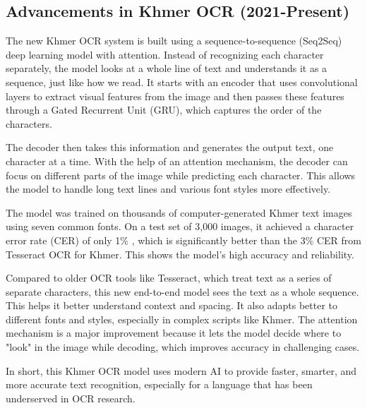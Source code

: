 \subsection{Advancements in Khmer OCR (2021-Present)}
\label{sec:advancements-in-khmer-ocr}

The new Khmer OCR system is built using a sequence-to-sequence (Seq2Seq) 
deep learning model with attention. Instead of recognizing each character separately, 
the model looks at a whole line of text and understands it as a sequence, 
just like how we read. It starts with an encoder that uses convolutional layers 
to extract visual features from the image and then passes these features 
through a Gated Recurrent Unit (GRU), which captures the order of the characters.

The decoder then takes this information and generates the output text, one character 
at a time. With the help of an attention mechanism, the decoder can focus on different 
parts of the image while predicting each character. This allows the model to handle 
long text lines and various font styles more effectively.

The model was trained on thousands of computer-generated Khmer text images using seven 
common fonts. On a test set of 3,000 images, it achieved a character error rate (CER) 
of only 1\% \citep{buoy2021seq2seq}, which is significantly better than the 3\% 
\citep{buoy2021seq2seq} CER from Tesseract OCR for Khmer. 
This shows the model's high accuracy and reliability.

Compared to older OCR tools like Tesseract, which treat text as a series of separate 
characters, this new end-to-end model sees the text as a whole sequence. 
This helps it better understand context and spacing. It also adapts better 
to different fonts and styles, especially in complex scripts like Khmer. 
The attention mechanism is a major improvement because it lets the model decide 
where to "look" in the image while decoding, which improves accuracy in challenging cases.

In short, this Khmer OCR model uses modern AI to provide faster, smarter, and 
more accurate text recognition, especially for a language that has been 
underserved in OCR research.

